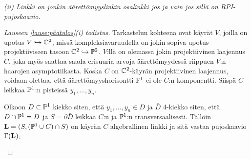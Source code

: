 \emph{(ii) Linkki on jonkin äärettömyyslinkin osalinkki jos ja vain jos sillä on RPI-pujoskaavio.}
\begin{proof}[Lauseen \ref{lause:päätulos}(i) todistus]
    Tarkastelun kohteena ovat käyrät $V$, joilla on upotus $V\hookrightarrow\C^2$, missä kompleksiavaruudella on jokin sopiva upotus projektiiviseen tasoon $\C^2\hookrightarrow\P^2$. $V$:llä on olemassa jokin projektiivinen laajennus $C$, joka myös saattaa saada erisuuria arvoja äärettömyydessä riippuen $V$:n haarojen asymptotiikasta. Koska $C$ on $\C^2$-käyrän projektiivinen laajennus, voidaan olettaa, että äärettömyyshorisontti $\P^1$ ei ole $C$:n komponentti. Siispä $C$ leikkaa $\P^1$:n pisteissä $y_1,\dots,y_n$.

    Olkoon $D\subset\P^1$ kiekko siten, että $y_1,\dots,y_n\in D$ ja $\bar D$ 4-kiekko siten, että $\bar D\cap \P^1=D$ ja $S=\partial\bar D$ leikkaa $C$:n ja $\P^1$:n transversaalisesti. Tällöin $\linkki=(S,(\P^1\cup C)\cap S)$ on käyrän $C$ algebrallinen linkki ja sitä vastaa pujoskaavio $\Gamma(\linkki)$:
    \begin{center}
\end{center}
\end{proof}
